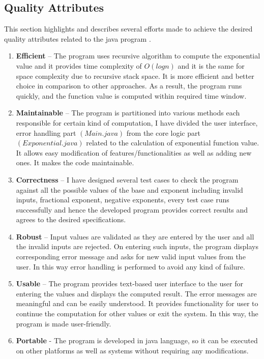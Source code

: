 \documentclass[12pt, a4paper]{article}
\begin{document}
\subsection{Quality Attributes}
This section highlights and describes several efforts made to achieve the desired quality attributes related to the java program \cite{Quality Assurance}.
\begin{enumerate}
    \item \textbf{Efficient} – The program uses recursive algorithm to compute the exponential value and it provides time complexity of $O(logn)$ and it is the same for space complexity due to recursive stack space. It is more efficient and better choice in comparison to other approaches. As a result, the program runs quickly, and the function value is computed within required time window.
    \item \textbf{Maintainable} – The program is partitioned into various methods each responsible for certain kind of computation, I have divided the user interface, error handling part $(Main.java)$ from the core logic part $(Exponential.java)$ related to the calculation of exponential function value. It allows easy modification of features/functionalities as well as adding new ones. It makes the code maintainable.
    \item \textbf{Correctness} – I have designed several test cases to check the program against all the possible values of the base and exponent including invalid inputs, fractional exponent, negative exponents, every test case runs successfully and hence the developed program provides correct results and agrees to the desired specifications.
    \item \textbf{Robust} – Input values are validated as they are entered by the user and all the invalid inputs are rejected. On entering such inputs, the program displays corresponding error message and asks for new valid input values from the user. In this way error handling is performed to avoid any kind of failure. 
    \item \textbf{Usable} – The program provides text-based user interface to the user for entering the values and displays the computed result. The error messages are meaningful and can be easily understood. It provides functionality for user to continue the computation for other values or exit the system. In this way, the program is made user-friendly.
    \item \textbf{Portable} - The program is developed in java language, so it can be executed on other platforms as well as systems without requiring any modifications. 
\end{enumerate}
\end{document}
